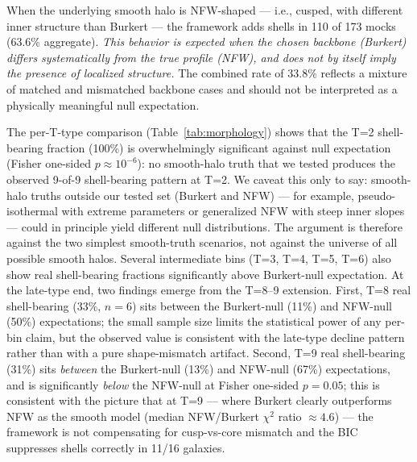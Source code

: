 When the underlying smooth halo is NFW-shaped --- i.e., cusped, with different inner structure than Burkert --- the framework adds shells in 110 of 173 mocks (63.6\% aggregate). \emph{This behavior is expected when the chosen backbone (Burkert) differs systematically from the true profile (NFW), and does not by itself imply the presence of localized structure.} The combined rate of 33.8\% reflects a mixture of matched and mismatched backbone cases and should not be interpreted as a physically meaningful null expectation.

The per-T-type comparison (Table~\ref{tab:morphology}) shows that the T=2 shell-bearing fraction (100\%) is overwhelmingly significant against null expectation (Fisher one-sided $p \approx 10^{-6}$): no smooth-halo truth that we tested produces the observed 9-of-9 shell-bearing pattern at T=2. We caveat this only to say: smooth-halo truths outside our tested set (Burkert and NFW) --- for example, pseudo-isothermal with extreme parameters or generalized NFW with steep inner slopes --- could in principle yield different null distributions. The argument is therefore against the two simplest smooth-truth scenarios, not against the universe of all possible smooth halos. Several intermediate bins (T=3, T=4, T=5, T=6) also show real shell-bearing fractions significantly above Burkert-null expectation. At the late-type end, two findings emerge from the T=8--9 extension. First, T=8 real shell-bearing (33\%, $n=6$) sits between the Burkert-null (11\%) and NFW-null (50\%) expectations; the small sample size limits the statistical power of any per-bin claim, but the observed value is consistent with the late-type decline pattern rather than with a pure shape-mismatch artifact. Second, T=9 real shell-bearing (31\%) sits \emph{between} the Burkert-null (13\%) and NFW-null (67\%) expectations, and is significantly \emph{below} the NFW-null at Fisher one-sided $p = 0.05$; this is consistent with the picture that at T=9 --- where Burkert clearly outperforms NFW as the smooth model (median NFW/Burkert $\chi^2$ ratio $\approx 4.6$) --- the framework is not compensating for cusp-vs-core mismatch and the BIC suppresses shells correctly in 11/16 galaxies.

